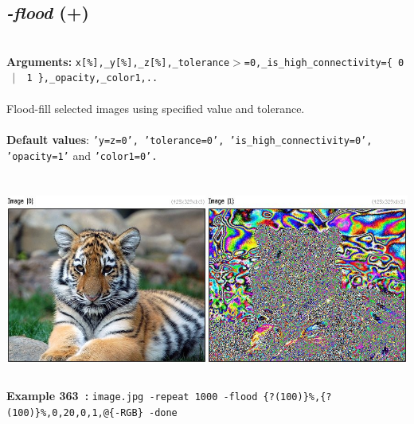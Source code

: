 \documentclass[a4paper,11pt,twoside]{book}
\begin{document}
\subsection{\emph{-flood} (+)}\vspace*{-0.5em}
~\\\textbf{Arguments: } 
{\small \texttt{x[\%],\_y[\%],\_z[\%],\_tolerance$>$=0,\_is\_high\_connectivity=\{ 0 ~$|$~ 1 \},\_opacity,\_color1,..}}\\~\\
Flood-fill selected images using specified value and tolerance.
~\\~\\\textbf{Default values}: {\small \texttt{'y=z=0', 'tolerance=0', 'is\_high\_connectivity=0', 'opacity=1'} and \texttt{'color1=0'.}}
\begin{center}\includegraphics[keepaspectratio=true,height=7cm,width=\textwidth]{img/gmic_def363.jpg}\\
{\footnotesize \textbf{Example 363~:} \texttt{image.jpg -repeat 1000 -flood \{?(100)\}\%,\{?(100)\}\%,0,20,0,1,@\{-RGB\} -done}}
\end{center}
\end{document}

